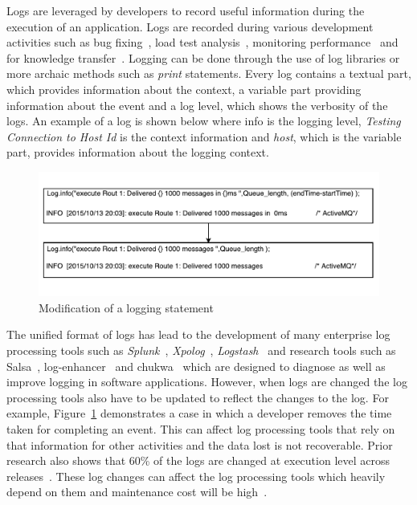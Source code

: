 

Logs are leveraged by developers to record useful information during the execution of an application. Logs are recorded during various development activities such as bug fixing~\cite{ConsoleLogs,JGLouMining,QFuanomaly}, load test analysis~\cite{Automatic}, monitoring performance~\cite{Yuan} and for knowledge transfer~\cite{IanWCRE}.
Logging can be done through the use of log libraries or more archaic methods such as \textsl{print} statements. Every log contains a textual part, which provides information about the context, a variable part providing information about the event and a log level, which shows the verbosity of the logs. An example of a log is shown below where info is the logging level, \textsl{Testing Connection to Host Id} is the context information and \textsl{host}, which is the variable part, provides information about the logging context.

\begin{figure}[tb]
	\centering
	\includegraphics[width=1\columnwidth]{ExampleOfLogChange_LPA}
	\caption{Modification of a logging statement}
	\label{fig:ExampleOfLogChange_LPA}
\end{figure}


The unified format of logs has lead to the development of many enterprise log processing tools such as \textsl{Splunk}~\cite{carasso2012exploring}, \textsl{Xpolog}~\cite{xpolog}, \textsl{Logstash}~\cite{xu2013detecting} and research tools such as Salsa~\cite{TanSalsa}, log-enhancer~\cite{Yuan} and chukwa~\cite{chukwa} which are designed to diagnose as well as improve logging in software applications. However, when logs are changed the log processing tools also have to be updated to reflect the changes to the log. For example, Figure~\ref{fig:ExampleOfLogChange_LPA} demonstrates a case in which a developer removes the time taken for completing an event. This can affect log processing tools that rely on that information for other activities and the data lost is not recoverable. Prior research also shows that 60\% of the logs are changed at execution level across releases~\cite{IanWCRE}. These log changes can affect the log processing tools which heavily depend on them and maintenance cost will be high~\cite{IanWCRE}. 

